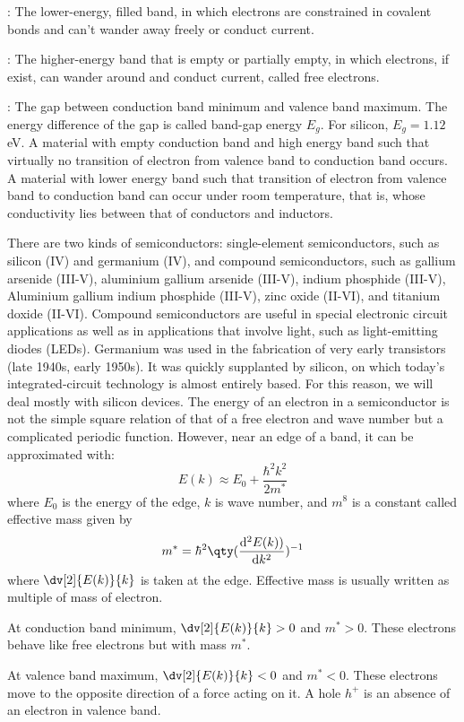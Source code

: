 \documentclass[a4paper,12pt]{article}
\begin{document}
\bit
\item{}: The lower-energy, filled band, in which electrons are constrained in covalent bonds and can't wander away freely or conduct current.
\item{}: The higher-energy band that is empty or partially empty, in which electrons, if exist, can wander around and conduct current, called free electrons.
\item{}: The gap between conduction band minimum and valence band maximum. The energy difference of the gap is called band-gap energy $E_g$. For silicon, $E_g=1.12$ eV.
\eit
{}
A material with empty conduction band and high energy band such that virtually no transition of electron from valence band to conduction band occurs.
A material with lower energy band such that transition of electron from valence band to conduction band can occur under room temperature, that is, whose conductivity lies between that of conductors and inductors.

There are two kinds of semiconductors: single-element semiconductors, such as silicon (IV) and germanium (IV), and compound semiconductors, such as gallium arsenide  (III-V), aluminium gallium arsenide  (III-V), indium phosphide  (III-V), Aluminium gallium indium phosphide  (III-V), zinc oxide  (II-VI), and titanium doxide  (II-VI). Compound semiconductors are useful in special electronic circuit applications as well as in applications that involve light, such as light-emitting diodes (LEDs). Germanium was used in the fabrication of very early transistors (late 1940s, early 1950s). It was quickly supplanted by silicon, on which today’s integrated-circuit technology is almost entirely based. For this reason, we will deal mostly with silicon devices.
The energy of an electron in a semiconductor is not the simple square relation of that of a free electron and wave number but a complicated periodic function. However, near an edge of a band, it can be approximated with:
\[E(k) \approx E_0 + \frac{\hbar^2 k^2}{2m^*}\]
where $E_0$ is the energy of the edge, $k$ is wave number, and $m^8$ is a constant called effective mass given by
\[m^*=\hbar^2\qty(\frac{\mathrm{d}^2E(k))}{\mathrm{d}k^2})^{-1}\]
where $\dv[2]{E(k)}{k}$ is taken at the edge. Effective mass is usually written as multiple of mass of electron.
\bit
\item At conduction band minimum, $\dv[2]{E(k)}{k}>0$ and $m^*>0$. These electrons behave like free electrons but with mass $m^*$.
\item At valence band maximum, $\dv[2]{E(k)}{k}<0$ and $m^*<0$. These electrons move to the opposite direction of a force acting on it.
\eit
{}
A hole $h^+$ is an absence of an electron in valence band.
\end{document}
